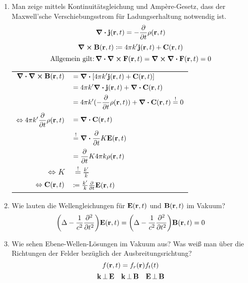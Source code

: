 \documentclass{scrartcl}
\newcommand{\ds}{\displaystyle}
\begin{document}
\begin{enumerate}
    \item Man zeige mittels Kontinuitätsgleichung und Ampère-Gesetz, 
          dass der Maxwell'sche Verschiebungsstrom für Ladungserhaltung
          notwendig ist.
          $$\div \vb j(\vb r, t) = -\pdv{t}\rho(\vb r ,t)$$
          $$\curl\vb B(\vb r, t) \coloneqq 
          4\pi k'\vb j(\vb r ,t) + \vb C(\vb r, t)$$
          $$\text{Allgemein gilt:}\,\div\curl\vb F(\vb r, t)
          =\curl \div \vb F(\vb r, t)=0$$
          \begin{center}
            \begin{tabular}{rl}
            $\ds \div\curl\vb B(\vb r, t)$
                        &$\ds= \div \qty[
                        4\pi k'\vb j(\vb r, t)+\vb C(\vb r, t)]$\\
                        &$\ds= 4\pi k'\div\vb j(\vb r,t) +
                        \div \vb C(\vb r,t)$\\
                        &$\ds= 4\pi k'(-\pdv{t}\rho(\vb r, t)) 
                        +\div \vb C(\vb r,t)\stackrel{!}{=}0$\\
            $\Leftrightarrow\ds 4\pi k'\pdv{t}\rho(\vb r, t)$ 
                        &$\ds =\div \vb 
                        C(\vb r, t)$\footnotemark\\
                        &$\ds \stackrel{!}{=}\div \pdv{t}K\vb E(\vb r, t)$\\
                        &$\ds =\ds \pdv{t} 
                        K4\pi k \rho(\vb r, t)$\\
            $\Leftrightarrow K$         
                        &$\stackrel{!}{=}\frac{k'}{k}$\\
            $\Leftrightarrow \vb C(\vb r,t)$
                        &$\coloneqq \frac{k'}{k}\pdv{t}\vb E(\vb r, t)$
            \end{tabular}
          \end{center}

    \item Wie lauten die Wellengleichungen für $\vb E(\vb r, t)$ und
          $\vb B(\vb r, t)$ im Vakuum?
          $$\qty(\Delta - \frac{1}{c^2}\pdv[2]{t})\vb E(\vb r, t)=
          \qty(\Delta - \frac{1}{c^2}\pdv[2]{t})\vb B(\vb r, t)=0$$

    \item Wie sehen Ebene-Wellen-Lösungen im Vakuum aus? Was weiß man
          über die Richtungen der Felder bezüglich der 
          Ausbreitungsrichtung?
          $$f(\vb r , t)=f_r(\vb r)f_t(t)$$
          $$\vb k \,\bot\, \vb E \quad \vb k\,\bot\,\vb B \quad
          \vb E\,\bot\, \vb B$$


\end{enumerate}
\end{document}
